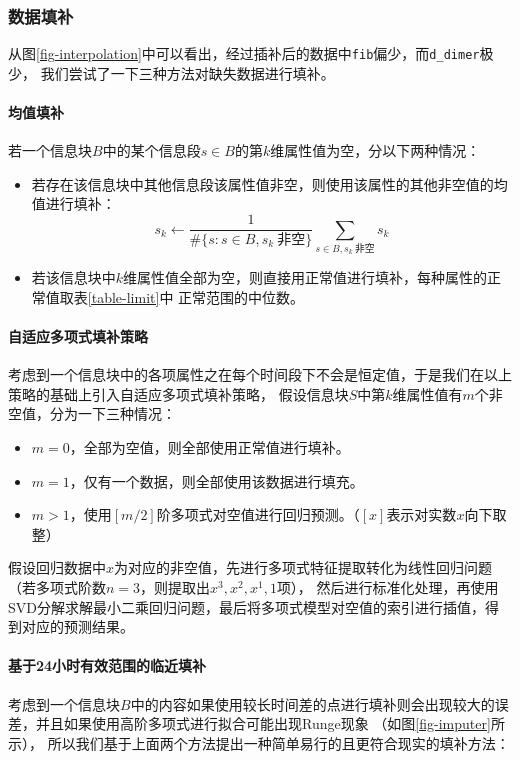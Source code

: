 \documentclass[12pt, a4paper, oneside]{ctexart}
\numberwithin{equation}{section}  %
\begin{document}
\subsubsection{数据填补}
从图\ref{fig-interpolation}中可以看出，经过插补后的数据中\texttt{fib}偏少，而\texttt{d\_dimer}极少，
我们尝试了一下三种方法对缺失数据进行填补。
\paragraph{均值填补}若一个信息块$B$中的某个信息段$s\in B$的第$k$维属性值为空，分以下两种情况：
\begin{itemize}
    \item 若存在该信息块中其他信息段该属性值非空，则使用该属性的其他非空值的均值进行填补：
    \begin{equation*}
        s_k\gets \frac{1}{\#\{s:s\in B,s_k\ \text{非空}\}}\sum_{s\in B, s_k\ \text{非空}}s_k
    \end{equation*}
    \item 若该信息块中$k$维属性值全部为空，则直接用正常值进行填补，每种属性的正常值取表\ref{table-limit}中
    正常范围的中位数。
\end{itemize}
\paragraph{自适应多项式填补策略}
考虑到一个信息块中的各项属性之在每个时间段下不会是恒定值，于是我们在以上策略的基础上引入自适应多项式填补策略，
假设信息块$S$中第$k$维属性值有$m$个非空值，分为一下三种情况：
\begin{itemize}
    \item $m=0$，全部为空值，则全部使用正常值进行填补。
    \item $m=1$，仅有一个数据，则全部使用该数据进行填充。
    \item $m>1$，使用$[m/2]$阶多项式对空值进行回归预测。（$[x]$表示对实数$x$向下取整）
\end{itemize}
假设回归数据中$x$为对应的非空值，先进行多项式特征提取转化为线性回归问题（若多项式阶数$n=3$，则提取出$x^3,x^2,x^1,1$项），
然后进行标准化处理，再使用SVD分解求解最小二乘回归问题，最后将多项式模型对空值的索引进行插值，得到对应的预测结果。
\paragraph{基于24小时有效范围的临近填补}
考虑到一个信息块$B$中的内容如果使用较长时间差的点进行填补则会出现较大的误差，并且如果使用高阶多项式进行拟合可能出现Runge现象
（如图\ref{fig-imputer}所示），
所以我们基于上面两个方法提出一种简单易行的且更符合现实的填补方法：
\end{document}
